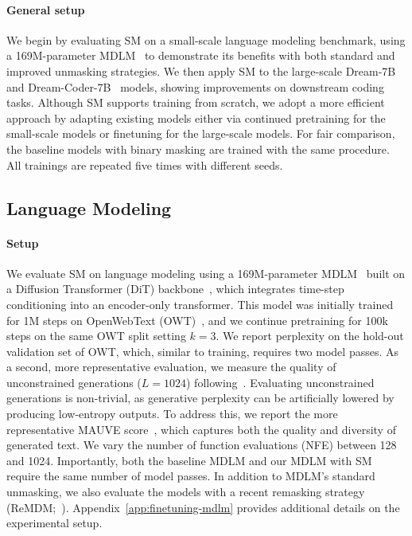 \documentclass{article}
\begin{document}
\paragraph{General setup} 
We begin by evaluating SM on a small-scale language modeling benchmark, using a 169M-parameter MDLM~\citep{sahoo_simple_2024} to demonstrate its benefits with both standard and improved unmasking strategies.
% 
We then apply SM to the large-scale Dream-7B~\citep{ye_dream_2025} and Dream-Coder-7B~\citep{xie_dream-coder_2025} models, showing improvements on downstream coding tasks.
%
Although SM supports training from scratch, we adopt a more efficient approach by adapting existing models either via continued pretraining for the small-scale models or finetuning for the large-scale models.
% 
For fair comparison, the baseline models with binary masking are trained with the same procedure.
% 
All trainings are repeated five times with different seeds. 

\subsection{Language Modeling}
\label{sec:language_modeling}
\paragraph{Setup} 
We evaluate SM on language modeling using a 169M-parameter MDLM~\citep{sahoo_simple_2024} built on a Diffusion Transformer (DiT) backbone~\citep{peebles_scalable_2023}, which integrates time-step conditioning into an encoder-only transformer.
%
This model was initially trained for 1M steps on OpenWebText (OWT)~\citep{Gokaslan2019OpenWeb}, and we continue pretraining for 100k steps on the same OWT split setting $k=3$. 
%
We report perplexity on the hold-out validation set of OWT, which, similar to training, requires two model passes.
%
As a second, more representative evaluation, we measure the quality of unconstrained generations ($L=1024$) following~\citet{wang_remasking_2025}. 
%
Evaluating unconstrained generations is non-trivial, as generative perplexity can be artificially lowered by producing low-entropy outputs. 
%
To address this, we report the more representative MAUVE score~\citep{pillutla2021mauve}, which captures both the quality and diversity of generated text.
%
We vary the number of function evaluations (NFE) between 128 and 1024. 
%
Importantly, both the baseline MDLM and our MDLM with SM require the same number of model passes. 
%
In addition to MDLM's standard unmasking, we also evaluate the models with a recent remasking strategy (ReMDM;~\citealt{wang_remasking_2025}). 
%
Appendix~\ref{app:finetuning-mdlm} provides additional details on the experimental setup.
\end{document}

